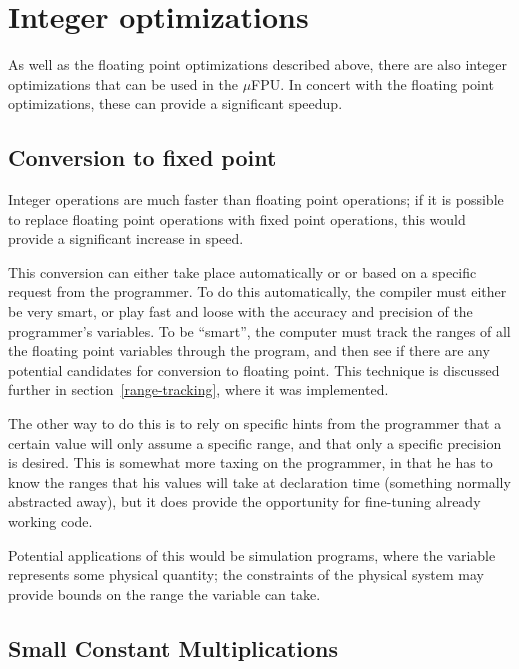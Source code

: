 %

\section{Integer optimizations}

As well as the floating point optimizations described above, there are also
integer optimizations that can be used in the $\mu$FPU.  In concert with the
floating point optimizations, these can provide a significant speedup.  

\subsection{Conversion to fixed point}

Integer operations are much faster than floating point operations; if it is
possible to replace floating point operations with fixed point operations, this
would provide a significant increase in speed.

This conversion can either take place automatically or or based on a specific
request from the programmer.  To do this automatically, the compiler must either
be very smart, or play fast and loose with the accuracy and precision of the
programmer's variables.  To be ``smart'', the computer must track the ranges of
all the floating point variables through the program, and then see if there are
any potential candidates for conversion to floating point.  This technique is
discussed further in section~\ref{range-tracking}, where it was implemented.

The other way to do this is to rely on specific hints from the programmer that a
certain value will only assume a specific range, and that only a specific
precision is desired.  This is somewhat more taxing on the programmer, in that
he has to know the ranges that his values will take at declaration time
(something normally abstracted away), but it does provide the opportunity for
fine-tuning already working code.

Potential applications of this would be simulation programs, where the variable
represents some physical quantity; the constraints of the physical system may
provide bounds on the range the variable can take.  \subsection{Small Constant
Multiplications}

